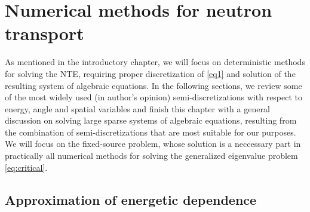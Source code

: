 \ifpdf
	\graphicspath{{3/pic/PNG/}{3/pic/PDF/}{3/pic/}}
\else
	\graphicspath{{3/pic/EPS/}{3/pic/}}
\fi

\chapter{Numerical methods for neutron transport}\label{chap:nte-methods}

As mentioned in the introductory chapter, we will focus on deterministic methods for solving the NTE, requiring proper
discretization of \eqref{eq1} and solution of the resulting system of algebraic equations. 
In the following sections, we review some of the most widely used (in author's opinion) semi-discretizations with respect to
energy, angle and spatial variables and finish this chapter with a general discussion on solving large sparse systems of
algebraic equations, resulting from the combination of semi-discretizations that are most suitable for our purposes. We
will focus on the fixed-source problem, whose solution is a neccessary part in practically all numerical methods for
solving the generalized eigenvalue problem \eqref{eq:critical}.

\section{Approximation of energetic dependence}

